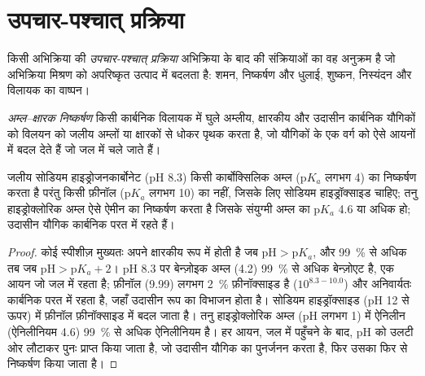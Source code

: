 \section{उपचार-पश्चात् प्रक्रिया}

\begin{definition}[उपचार-पश्चात् प्रक्रिया]\label{def:b2:lab-techniques-2:work-up}
किसी अभिक्रिया की \emph{उपचार-पश्चात् प्रक्रिया} अभिक्रिया के बाद की संक्रियाओं का वह अनुक्रम है जो
अभिक्रिया मिश्रण को अपरिष्कृत उत्पाद में बदलता है: शमन, निष्कर्षण और धुलाई, शुष्कन,
निस्यंदन और विलायक का वाष्पन।
\end{definition}

\begin{definition}[अम्ल--क्षारक निष्कर्षण]\label{def:b2:lab-techniques-2:acid-base-extraction}
\emph{अम्ल--क्षारक निष्कर्षण} किसी कार्बनिक विलायक में घुले अम्लीय, क्षारकीय और उदासीन कार्बनिक
यौगिकों को विलयन को जलीय अम्लों या क्षारकों से धोकर पृथक करता है, जो
यौगिकों के एक वर्ग को ऐसे आयनों में बदल देते हैं जो जल में चले जाते हैं।
\end{definition}

\begin{proposition}[कौन कहाँ जाता है]\label{prop:b2:lab-techniques-2:acid-base-extraction}
जलीय सोडियम हाइड्रोजनकार्बोनेट (pH 8.3) किसी कार्बोक्सिलिक अम्ल ($\mathrm pK_a$ लगभग 4) का निष्कर्षण करता है परंतु किसी
फ़ीनॉल ($\mathrm pK_a$ लगभग 10) का नहीं, जिसके लिए सोडियम हाइड्रॉक्साइड चाहिए; तनु हाइड्रोक्लोरिक अम्ल ऐसे
ऐमीन का निष्कर्षण करता है जिसके संयुग्मी अम्ल का $\mathrm pK_a$ 4.6 या अधिक हो; उदासीन यौगिक कार्बनिक
परत में रहते हैं।
\end{proposition}

\begin{proof}
कोई स्पीशीज़ मुख्यतः अपने क्षारकीय रूप में होती है जब $\mathrm{pH} > \mathrm pK_a$, और 99~\% से अधिक तब जब
$\mathrm{pH} > \mathrm pK_a + 2$। pH 8.3 पर बेन्ज़ोइक अम्ल (4.2) 99~\% से अधिक बेन्ज़ोएट है, एक आयन
जो जल में रहता है; फ़ीनॉल (9.99) लगभग 2~\% फ़ीनॉक्साइड है ($10^{8.3 - 10.0}$) और अनिवार्यतः
कार्बनिक परत में रहता है, जहाँ उदासीन रूप का विभाजन होता है। सोडियम हाइड्रॉक्साइड (pH 12 से ऊपर) में फ़ीनॉल
फ़ीनॉक्साइड में बदल जाता है। तनु हाइड्रोक्लोरिक अम्ल (pH लगभग 1) में ऐनिलीन (ऐनिलीनियम 4.6) 99~\% से अधिक
ऐनिलीनियम है। हर आयन, जल में पहुँचने के बाद, pH को उलटी ओर लौटाकर पुनः प्राप्त किया जाता है, जो
उदासीन यौगिक का पुनर्जनन करता है, फिर उसका फिर से निष्कर्षण किया जाता है।
\end{proof}

